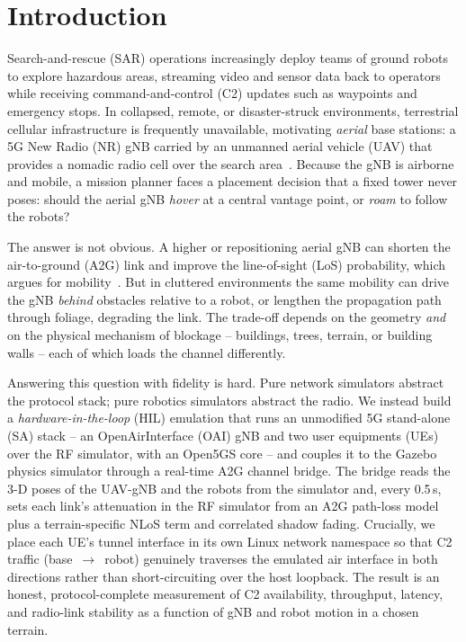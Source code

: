 \documentclass[conference]{IEEEtran}
\begin{document}
\section{Introduction}
Search-and-rescue (SAR) operations increasingly deploy teams of ground robots to
explore hazardous areas, streaming video and sensor data back to operators while
receiving command-and-control (C2) updates such as waypoints and emergency stops.
In collapsed, remote, or disaster-struck environments, terrestrial cellular
infrastructure is frequently unavailable, motivating \emph{aerial} base stations:
a 5G New Radio (NR) gNB carried by an unmanned aerial vehicle (UAV) that provides
a nomadic radio cell over the search area~\cite{zeng2016wireless,mozaffari2019tutorial}.
Because the gNB is airborne and mobile, a mission planner faces a placement
decision that a fixed tower never poses: should the aerial gNB \emph{hover} at a
central vantage point, or \emph{roam} to follow the robots?

The answer is not obvious. A higher or repositioning aerial gNB can shorten the
air-to-ground (A2G) link and improve the line-of-sight (LoS) probability, which
argues for mobility~\cite{alhourani2014optimal}. But in cluttered environments the
same mobility can drive the gNB \emph{behind} obstacles relative to a robot, or
lengthen the propagation path through foliage, degrading the link. The trade-off
depends on the geometry \emph{and} on the physical mechanism of blockage --
buildings, trees, terrain, or building walls -- each of which loads the channel
differently.

Answering this question with fidelity is hard. Pure network simulators abstract
the protocol stack; pure robotics simulators abstract the radio. We instead build
a \emph{hardware-in-the-loop} (HIL) emulation that runs an unmodified 5G
stand-alone (SA) stack -- an OpenAirInterface (OAI) gNB and two user equipments
(UEs) over the RF simulator, with an Open5GS core -- and couples it to the Gazebo
physics simulator through a real-time A2G channel bridge. The bridge reads the
3-D poses of the UAV-gNB and the robots from the simulator and, every
0.5\,s, sets each link's attenuation in the RF simulator from an A2G
path-loss model plus a terrain-specific NLoS term and correlated shadow fading.
Crucially, we place each UE's tunnel interface in its own Linux network namespace
so that C2 traffic (base~$\rightarrow$~robot) genuinely traverses the emulated air
interface in both directions rather than short-circuiting over the host loopback.
The result is an honest, protocol-complete measurement of C2 availability,
throughput, latency, and radio-link stability as a function of gNB and robot
motion in a chosen terrain.
\end{document}
